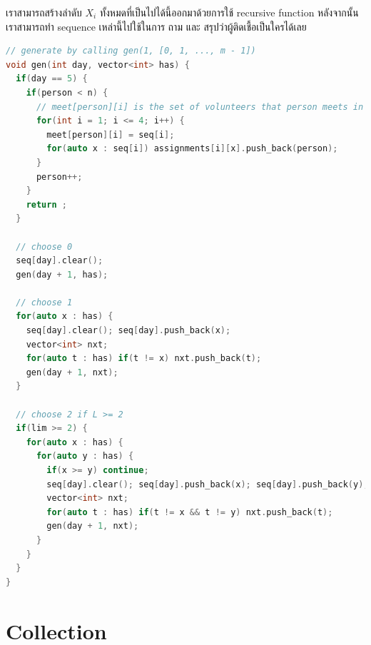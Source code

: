 \documentclass[12pt]{article}
\begin{document}
เราสามารถสร้างลำดับ $X_i$ ทั้งหมดที่เป็นไปได้นี้ออกมาด้วยการใช้ recursive function หลังจากนั้น เราสามารถทำ sequence เหล่านี้ไปใช้ในการ ถาม และ สรุปว่าผู้ติดเชื้อเป็นใครได้เลย

\begin{lstlisting}[language=C++]
// generate by calling gen(1, [0, 1, ..., m - 1])
void gen(int day, vector<int> has) {
  if(day == 5) {
    if(person < n) {
      // meet[person][i] is the set of volunteers that person meets in day i
      for(int i = 1; i <= 4; i++) {
        meet[person][i] = seq[i];
        for(auto x : seq[i]) assignments[i][x].push_back(person);
      }
      person++;
    }
    return ;
  }
  
  // choose 0
  seq[day].clear();
  gen(day + 1, has);

  // choose 1
  for(auto x : has) {
    seq[day].clear(); seq[day].push_back(x);
    vector<int> nxt;
    for(auto t : has) if(t != x) nxt.push_back(t);
    gen(day + 1, nxt);
  }
  
  // choose 2 if L >= 2
  if(lim >= 2) {
    for(auto x : has) {
      for(auto y : has) {
        if(x >= y) continue;
        seq[day].clear(); seq[day].push_back(x); seq[day].push_back(y);
        vector<int> nxt;
        for(auto t : has) if(t != x && t != y) nxt.push_back(t);
        gen(day + 1, nxt);
      }
    }
  }
}
\end{lstlisting}

\newpage

































\section{Collection}

\newpage
\end{document}
